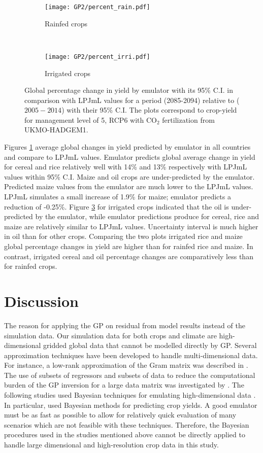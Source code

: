 \begin{figure}[!Ht]
\begin{subfigure}[h]{\textwidth}
\centering
\texttt{[image: GP2/percent\_rain.pdf]}
\caption{Rainfed crops}
\label{global1}
\end{subfigure}\\
\begin{subfigure}[h]{\textwidth}
\centering
\texttt{[image: GP2/percent\_irri.pdf]}
\caption{Irrigated crops}
\label{global2}
\end{subfigure}
\caption{Global percentage change in yield by emulator with its 95\% C.I. in comparison with LPJmL values for a period (2085-2094) relative to ($2005-2014$) with their 95\% C.I. The plots correspond to crop-yield for management level of 5, RCP6 with CO$_2$ fertilization from UKMO-HADGEM1.}
\end{figure}

Figures \ref{global1} average global changes in yield predicted by emulator in all countries and compare to LPJmL values.
Emulator predicts global average change in yield for cereal and rice relatively well with 14\% and 13\% respectively with LPJmL values within 95\% C.I. Maize and oil crops are under-predicted by the emulator. Predicted maize values from the emulator are much lower to the LPJmL values. LPJmL simulates a small increase of 1.9\% for maize; emulator predicts a reduction of -0.25\%. Figure \ref{global2} for irrigated crops indicated that the oil is under-predicted by the emulator, while emulator predictions produce for cereal, rice and maize are relatively similar to LPJmL values. Uncertainty interval is much higher in oil than for other crops. Comparing the two plots irrigated rice and maize global percentage changes in yield are higher than for rainfed rice and maize. In contrast, irrigated cereal and oil percentage changes are comparatively less than for rainfed crops.


\section{Discussion}
The reason for applying the GP on residual from model results instead of the simulation data. Our simulation data for both crops and climate are high-dimensional gridded global data that cannot be modelled directly by GP. Several approximation techniques have been developed to handle multi-dimensional data. For instance, a low-rank approximation of the Gram matrix was described in \cite{q10,q11}. The use of subsets of regressors and subsets of data to reduce the computational burden of the GP inversion for a large data matrix was investigated by \cite{q12,q13,q14}. The following studies used Bayesian techniques for emulating high-dimensional data \cite{q28,q29,q22,q23,qq}. In particular, \cite{r3,qq62} used Bayesian methods for predicting crop yields. A good emulator must be as fast as possible to allow for relatively quick evaluation of many scenarios which are not feasible with these techniques. Therefore, the Bayesian procedures used in the studies mentioned above cannot be directly applied to handle large dimensional and high-resolution crop data in this study. 

